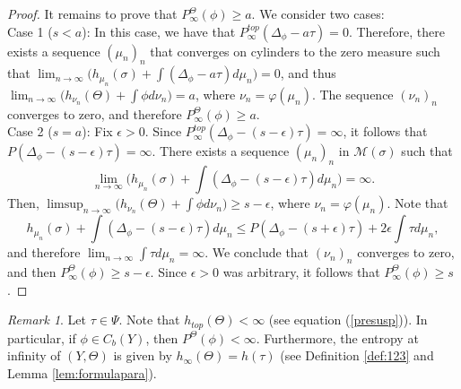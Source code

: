 \documentclass[letterpaper,11pt]{amsart}
\theoremstyle{plain}
\theoremstyle{plain}
\newtheorem{lemma}[proposition]{Lemma}
\theoremstyle{definition}
\theoremstyle{remark}
\newtheorem{remark}{Remark}[section]
\def\R{{\mathbb R}}
\def\M{{\mathcal M}}
\begin{document}
\begin{proof}
It remains to prove that $P_\infty^\Theta(\phi)\ge a$. We consider two cases:\\
Case 1 ($s<a$): In this case, we have that $P^{top}_\infty(\Delta_\phi-a\tau)=0$. Therefore, there exists a sequence $(\mu_n)_n$ that converges on cylinders to the zero measure such that $\lim_{n\to\infty}\big(h_{\mu_n}(\sigma)+\int (\Delta_\phi-a\tau)d\mu_n\big)=0$, and thus $\lim_{n\to\infty}\big(h_{\nu_n}(\Theta)+\int \phi d\nu_n\big)=a$, where $\nu_n=\varphi(\mu_n)$. The sequence $(\nu_n)_n$ converges to zero, and therefore $P_\infty^\Theta(\phi)\ge a$.\\
Case 2 ($s=a$): Fix $\epsilon>0$. Since  $P^{top}_\infty(\Delta_\phi-(s-\epsilon)\tau)=\infty$, it follows that $P(\Delta_\phi-(s-\epsilon)\tau)=\infty$. There exists a sequence $(\mu_n)_n$ in $\M(\sigma)$ such that 
$$\lim_{n\to\infty}\big(h_{\mu_n}(\sigma)+\int (\Delta_\phi-(s-\epsilon)\tau)d\mu_n\big)=\infty.$$ Then, $\limsup_{n\to\infty}\big(h_{\nu_n}(\Theta)+\int \phi d\nu_n\big)\ge s-\epsilon$, where $\nu_n=\varphi(\mu_n)$. Note that $$h_{\mu_n}(\sigma)+\int (\Delta_\phi-(s-\epsilon)\tau)d\mu_n\le P(\Delta_\phi-(s+\epsilon)\tau)+2\epsilon \int \tau d\mu_n,$$ and therefore $\lim_{n\to\infty} \int \tau d\mu_n=\infty$. We conclude that $(\nu_n)_n$ converges to zero, and then $P_\infty^\Theta(\phi)\ge s-\epsilon$. Since $\epsilon>0$ was arbitrary, it follows that  $P_\infty^\Theta(\phi)\ge s$.
\end{proof}



\begin{remark}\label{Psisusp} Let $\tau\in \Psi$. Note that $h_{top}(\Theta)<\infty$ (see equation (\ref{presusp})). In particular, if $\phi\in C_b(Y)$, then $P^\Theta(\phi)<\infty$. %
Furthermore, the entropy at infinity of $(Y,\Theta)$ is given by $h_\infty(\Theta)=h(\tau)$ (see Definition \ref{def:123} and Lemma \ref{lem:formulapara}).
\end{remark}
\end{document}
